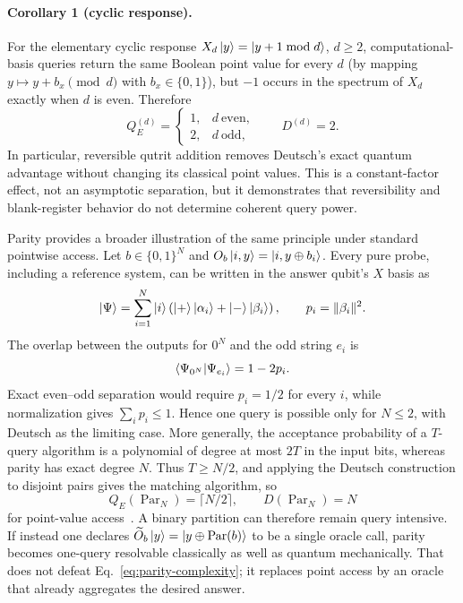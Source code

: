 \documentclass[
  aps,
  prl,
  reprint,
  nofootinbib
]{revtex4-2}
\begin{document}
\paragraph{Corollary 1 (cyclic response).}
For the elementary cyclic response \(X_d\ket y=\ket{y+1\bmod d}\), \(d\ge2\),
computational-basis queries return the same Boolean point value for every
\(d\) (by mapping \(y\mapsto y+b_x \pmod d\) with \(b_x\in\{0,1\}\)),
but \(-1\) occurs in the spectrum of \(X_d\) exactly when \(d\) is even.
Therefore
\begin{equation}
 Q_E^{(d)}=
 \begin{cases}1,&d\ \text{even},\\2,&d\ \text{odd},\end{cases}
 \qquad D^{(d)}=2.
 \label{eq:cyclic-response-cost}
\end{equation}
In particular, reversible qutrit addition removes Deutsch's exact quantum
advantage without changing its classical point values. This is a
constant-factor effect, not an asymptotic separation, but it demonstrates
that reversibility and blank-register behavior do not determine coherent
query power.

Parity provides a broader illustration of the same principle under standard
pointwise access. Let \(b\in\{0,1\}^N\) and
\(O_b\ket{i,y}=\ket{i,y\oplus b_i}\). Every pure probe, including a
reference system, can be written in the answer qubit's \(X\) basis as
\begin{equation}
 \ket\Psi=\sum_{i=1}^N\ket i
 \left(\ket+\ket{\alpha_i}+\ket-\ket{\beta_i}\right),
 \qquad p_i=\lVert\beta_i\rVert^2 .
 \label{eq:parity-probe}
\end{equation}
The overlap between the outputs for \(0^N\) and the odd string \(e_i\) is
\begin{equation}
 \braket{\Psi_{0^N}|\Psi_{e_i}}=1-2p_i.
 \label{eq:parity-overlap}
\end{equation}
Exact even--odd separation would require \(p_i=1/2\) for every \(i\), while
normalization gives \(\sum_i p_i\le1\). Hence one query is possible only
for \(N\le2\), with Deutsch as the limiting case. More generally, the
acceptance probability of a \(T\)-query algorithm is a polynomial of degree
at most \(2T\) in the input bits, whereas parity has exact degree \(N\).
Thus \(T\ge N/2\), and applying the Deutsch construction to disjoint pairs
gives the matching algorithm, so
\begin{equation}
 Q_E(\operatorname{Par}_N)=\lceil N/2\rceil,
 \qquad D(\operatorname{Par}_N)=N
 \label{eq:parity-complexity}
\end{equation}
for point-value access~\cite{bbcmw-01,Farhi-98}. A binary partition can
therefore remain query intensive. If instead one declares
\(\widetilde O_b\ket y=\ket{y\oplus\operatorname{Par}(b)}\) to be a single
oracle call, parity becomes one-query resolvable classically as well as
quantum mechanically. That does not defeat
Eq.~\eqref{eq:parity-complexity}; it replaces point access by an oracle that
already aggregates the desired answer.
\end{document}
